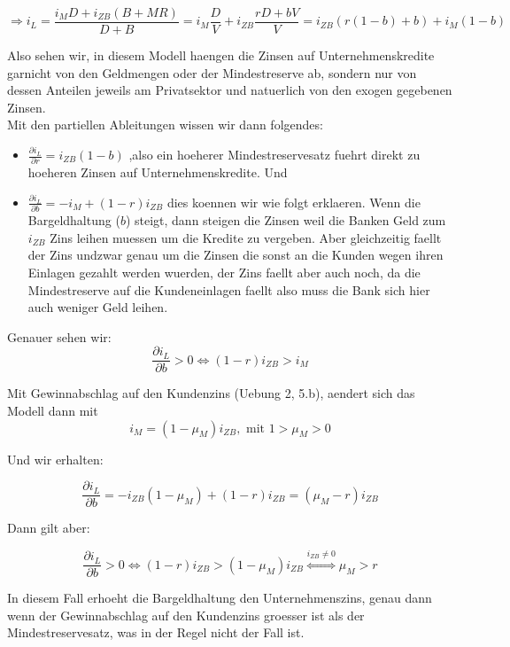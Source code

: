 \documentclass[a4paper]{article}
\begin{document}
\[
	\Rightarrow i_L = \frac{ i_M D + i_{ZB} (B + MR) }{ D + B } =
	i_M \frac{ D }{ V } + i_{ZB} \frac{ rD + bV }{ V } =
	i_{ZB} \left(
	r (1-b) + b
	\right) + i_M \left(
	1 - b
	\right)
\]

Also sehen wir, in diesem Modell haengen die Zinsen auf Unternehmenskredite
garnicht von den Geldmengen oder der Mindestreserve ab, sondern nur von dessen
Anteilen jeweils am Privatsektor und natuerlich von den exogen gegebenen Zinsen. \\

Mit den partiellen Ableitungen wissen wir dann folgendes:

\begin{itemize}
	\item $\frac{ \partial i_L }{ \partial r } = i_{ZB} (1 - b)$
	      ,also ein hoeherer Mindestreservesatz fuehrt direkt
	      zu hoeheren Zinsen auf Unternehmenskredite. Und

	\item $\frac{ \partial i_L }{ \partial b } = -i_M + (1 - r) i_{ZB}$
	      dies koennen wir wie folgt erklaeren. Wenn die Bargeldhaltung ($b$)
	      steigt, dann steigen die Zinsen weil die Banken Geld zum $i_{ZB}$
	      Zins leihen muessen um die Kredite zu vergeben. Aber gleichzeitig
	      faellt der Zins undzwar genau um die Zinsen die sonst an die Kunden
	      wegen ihren Einlagen gezahlt werden wuerden, der Zins faellt aber auch
	      noch, da die Mindestreserve auf die Kundeneinlagen faellt also muss die
	      Bank sich hier auch weniger Geld leihen.
\end{itemize}

Genauer sehen wir:
\[
	\frac{ \partial i_L }{ \partial b } > 0 \Leftrightarrow
	(1 - r) i_{ZB} > i_M
\]

Mit Gewinnabschlag auf den Kundenzins (Uebung 2, 5.b),
aendert sich das Modell dann mit
\[
	i_M = (1 - \mu_M) i_{ZB}, \text{ mit } 1 > \mu_M > 0
\]

Und wir erhalten:

\[
	\frac{ \partial i_L }{ \partial b } =
	- i_{ZB} (1 - \mu_M) + (1 - r) i_{ZB} =
	(\mu_M - r) i_{ZB}
\]

Dann gilt aber:

\[
	\frac{ \partial i_L }{ \partial b } > 0 \Leftrightarrow
	(1 - r) i_{ZB} > (1 - \mu_M) i_{ZB} \overset{i_{ZB} \neq 0} \Leftrightarrow
	\mu_M > r
\]

In diesem Fall erhoeht die Bargeldhaltung den Unternehmenszins, genau dann wenn
der Gewinnabschlag auf den Kundenzins groesser ist als der Mindestreservesatz,
was in der Regel nicht der Fall ist.
\end{document}
